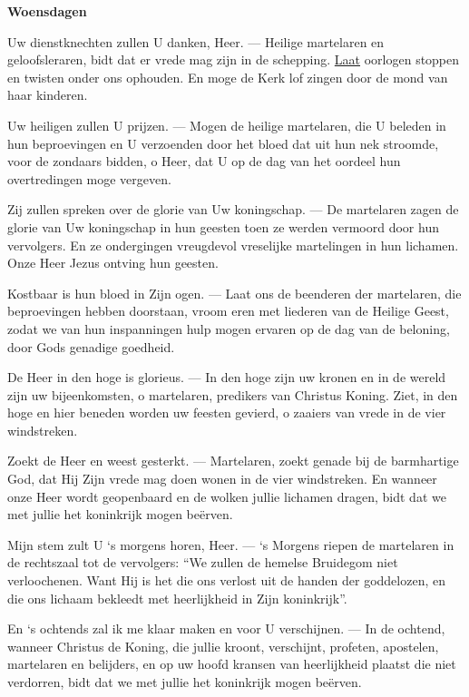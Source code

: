 \documentclass[12pt,twoside,a5paper]{article}
\newlength{\origparskip}
\newenvironment{halfparskip}{
  \setlength{\parskip}{0.5\origparskip}
}{
  \setlength{\parskip}{\origparskip}
}
\newcommand{\liturgicaloption}[1]{{\color{BrickRed}\textbf{#1}}}
\newcommand{\markedday}[1]{%
  \liturgicaloption{#1}%
  \markright{#1}%
}
\begin{document}
\markedday{Woensdagen}

\begin{halfparskip}
  Uw dienstknechten zullen U danken, Heer. --- Heilige martelaren en geloofsleraren, bidt dat er vrede mag zijn in de schepping. \underline{Laat} oorlogen stoppen en twisten onder ons ophouden. En moge de Kerk lof zingen door de mond van haar kinderen.

  Uw heiligen zullen U prijzen. --- Mogen de heilige martelaren, die U beleden in hun beproevingen en U verzoenden door het bloed dat uit hun nek stroomde, voor de zondaars bidden, o Heer, dat U op de dag van het oordeel hun overtredingen moge vergeven.

  Zij zullen spreken over de glorie van Uw koningschap. --- De martelaren zagen de glorie van Uw koningschap in hun geesten toen ze werden vermoord door hun vervolgers. En ze ondergingen vreugdevol vreselijke martelingen in hun lichamen. Onze Heer Jezus ontving hun geesten.

  Kostbaar is hun bloed in Zijn ogen. --- Laat ons de beenderen der martelaren, die beproevingen hebben doorstaan, vroom eren met liederen van de Heilige Geest, zodat we van hun inspanningen hulp mogen ervaren op de dag van de beloning, door Gods genadige goedheid.

  De Heer in den hoge is glorieus. --- In den hoge zijn uw kronen en in de wereld zijn uw bijeenkomsten, o martelaren, predikers van Christus Koning. Ziet, in den hoge en hier beneden worden uw feesten gevierd, o zaaiers van vrede in de vier windstreken.

  Zoekt de Heer en weest gesterkt. --- Martelaren, zoekt genade bij de barmhartige God, dat Hij Zijn vrede mag doen wonen in de vier windstreken. En wanneer onze Heer wordt geopenbaard en de wolken jullie lichamen dragen, bidt dat we met jullie het koninkrijk mogen beërven.

  Mijn stem zult U `s morgens horen, Heer. --- `s Morgens riepen de martelaren in de rechtszaal tot de vervolgers: ``We zullen de hemelse Bruidegom niet verloochenen. Want Hij is het die ons verlost uit de handen der goddelozen, en die ons lichaam bekleedt met heerlijkheid in Zijn koninkrijk''.

  En `s ochtends zal ik me klaar maken en voor U verschijnen. --- In de ochtend, wanneer Christus de Koning, die jullie kroont, verschijnt, profeten, apostelen, martelaren en belijders, en op uw hoofd kransen van heerlijkheid plaatst die niet verdorren, bidt dat we met jullie het koninkrijk mogen beërven.


\end{halfparskip}
\end{document}
